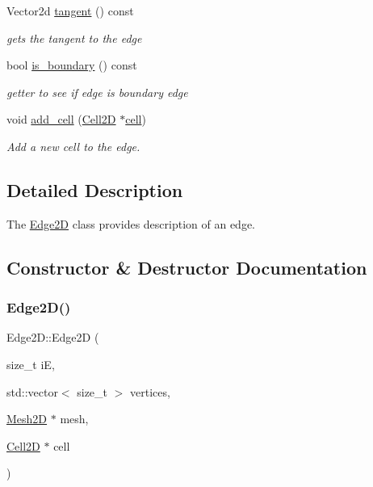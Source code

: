 \begin{DoxyCompactItemize}
\mbox{\label{classHArDCore2D_1_1Edge2D_a033c6a0827f54b2adf059942d17468d6}} 
Vector2d \hyperlink{classHArDCore2D_1_1Edge2D_a033c6a0827f54b2adf059942d17468d6}{tangent} () const
\begin{DoxyCompactList}\small\item\em gets the tangent to the edge \end{DoxyCompactList}\item 
bool \hyperlink{group__Mesh2D_ga9a012ccc3edb2b93501ed25fe8852141}{is\+\_\+boundary} () const
\begin{DoxyCompactList}\small\item\em getter to see if edge is boundary edge \end{DoxyCompactList}\item 
\mbox{\label{classHArDCore2D_1_1Edge2D_a206bd371085de27b2d404eef6c1cadae}} 
void \hyperlink{classHArDCore2D_1_1Edge2D_a206bd371085de27b2d404eef6c1cadae}{add\+\_\+cell} (\hyperlink{classHArDCore2D_1_1Cell2D}{Cell2D} $\ast$\hyperlink{classHArDCore2D_1_1Edge2D_aec9ba58af7a02bd31c4275edde79b5c6}{cell})
\begin{DoxyCompactList}\small\item\em Add a new cell to the edge. \end{DoxyCompactList}\end{DoxyCompactItemize}


\subsection{Detailed Description}
The \hyperlink{classHArDCore2D_1_1Edge2D}{Edge2D} class provides description of an edge. 

\subsection{Constructor \& Destructor Documentation}
\mbox{\label{classHArDCore2D_1_1Edge2D_af3b982ed5bedc795c29e621a675a9137}} 
\subsubsection{\texorpdfstring{Edge2\+D()}{Edge2D()}}
{\footnotesize\ttfamily Edge2\+D\+::\+Edge2D (\begin{DoxyParamCaption}\item[{size\+\_\+t}]{iE,  }\item[{std\+::vector$<$ size\+\_\+t $>$}]{vertices,  }\item[{\hyperlink{classHArDCore2D_1_1Mesh2D}{Mesh2D} $\ast$}]{mesh,  }\item[{\hyperlink{classHArDCore2D_1_1Cell2D}{Cell2D} $\ast$}]{cell }\end{DoxyParamCaption})}

